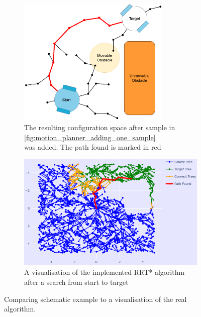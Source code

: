 \begin{figure}[H]
    \centering
    \begin{subfigure}{.5\textwidth}
    \centering
    \includegraphics[width=0.8\textwidth]{figures/mp/7mp_path_found.drawio.png}
    \caption{The resulting configuration space after sample in \cref{fig:motion_planner_adding_one_sample}\\ was added. The path found is marked in red}
    \end{subfigure}%
    \begin{subfigure}{.5\textwidth}
    \hspace{-1cm}
    \includegraphics[width=1.1\textwidth]{figures/mp/mp_the_real_deal.png}
    \caption{A visualisation of the implemented \acs{RRT*} algorithm\\after a search from start to target}
    \end{subfigure}
    \label{fig:motion_planner_comparison}%
    \caption{Comparing schematic example to a visualisation of the real algorithm.}
\end{figure}

